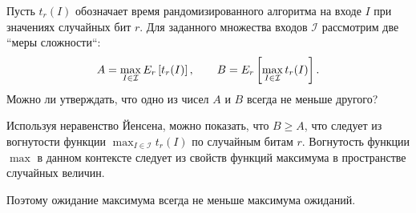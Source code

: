 \documentclass[11pt]{article}
\renewcommand{\ge}{\geqslant}   %
\begin{document}
\begin{problem}{5}
Пусть $t_r(I)$ обозначает время рандомизированного алгоритма на входе $I$ при значениях случайных бит $r$. Для заданного множества входов $\mathcal{I}$
рассмотрим две ``меры сложности``:
$$
	A = \mathop{\rm max}_{I \in \mathcal{I}} E_r \left[ t_r(I) \right], \qquad
	B = E_r \left[ \mathop{\rm max}_{I \in \mathcal{I}} t_r(I) \right].
$$
Можно ли утверждать, что одно из чисел $A$ и $B$ всегда не меньше другого?
\end{problem}

\begin{solution}
	Используя неравенство Йенсена, можно показать, что $B \ge A$, что следует из вогнутости функции $\max_{I \in \mathcal{I}} t_r(I)$ по случайным битам $r$. Вогнутость функции $\max$ в данном контексте следует из свойств функций максимума в пространстве случайных величин.

	Поэтому ожидание максимума всегда не меньше максимума ожиданий.
\end{solution}
\end{document}
